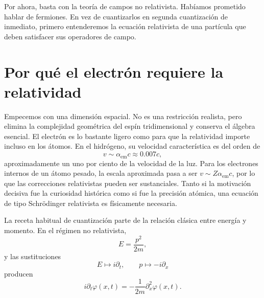 \begin{classroomqa}
\end{classroomqa}

Por ahora, basta con la teoría de campos no relativista. Habíamos prometido hablar de fermiones. En vez de cuantizarlos en segunda cuantización de inmediato, primero entenderemos la ecuación relativista de una partícula que deben satisfacer sus operadores de campo.

\section{Por qué el electrón requiere la relatividad}

Empecemos con una dimensión espacial. No es una restricción realista, pero elimina la complejidad geométrica del espín tridimensional y conserva el álgebra esencial. El electrón es lo bastante ligero como para que la relatividad importe incluso en los átomos. En el hidrógeno, su velocidad característica es del orden de
\begin{equation}
v\sim\alpha_{\mathrm{em}}c\approx 0.007c,
\end{equation}
aproximadamente un uno por ciento de la velocidad de la luz. Para los electrones internos de un átomo pesado, la escala aproximada pasa a ser \(v\sim Z\alpha_{\mathrm{em}}c\), por lo que las correcciones relativistas pueden ser sustanciales. Tanto si la motivación decisiva fue la curiosidad histórica como si fue la precisión atómica, una ecuación de tipo Schr\"odinger relativista es físicamente necesaria.

La receta habitual de cuantización parte de la relación clásica entre energía y momento. En el régimen no relativista,
\begin{equation}
E=\frac{p^2}{2m},
\end{equation}
y las sustituciones
\begin{equation}
E\mapsto i\partial_t,
\qquad
p\mapsto-i\partial_x
\end{equation}
producen
\begin{equation}
i\partial_t\varphi(x,t)
=-\frac{1}{2m}\partial_x^2\varphi(x,t).
\end{equation}

